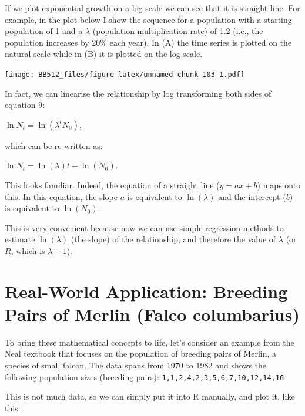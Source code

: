 \documentclass[
  a4paper]{book}
\newenvironment{Shaded}{\begin{snugshade}}{\end{snugshade}}
\newcommand{\AttributeTok}[1]{\textcolor[rgb]{0.13,0.29,0.53}{#1}}
\newcommand{\DecValTok}[1]{\textcolor[rgb]{0.00,0.00,0.81}{#1}}
\newcommand{\FunctionTok}[1]{\textcolor[rgb]{0.13,0.29,0.53}{\textbf{#1}}}
\newcommand{\NormalTok}[1]{#1}
\newcommand{\OtherTok}[1]{\textcolor[rgb]{0.56,0.35,0.01}{#1}}
\newcommand{\SpecialCharTok}[1]{\textcolor[rgb]{0.81,0.36,0.00}{\textbf{#1}}}
\newcommand{\StringTok}[1]{\textcolor[rgb]{0.31,0.60,0.02}{#1}}
\begin{document}
If we plot exponential growth on a log scale we can see that it is straight line. For example, in the plot below I show the sequence for a population with a starting population of 1 and a \(\lambda\) (population multiplication rate) of 1.2 (i.e., the population increases by 20\% each year). In (A) the time series is plotted on the natural scale while in (B) it is plotted on the log scale.

\texttt{[image: BB512\_files/figure-latex/unnamed-chunk-103-1.pdf]}

In fact, we can linearise the relationship by log transforming both sides of equation 9:

\(\ln{N_t} = \ln(\lambda ^tN_0)\),

which can be re-written as:

\(\ln{N_t} = \ln(\lambda )t + \ln(N_0)\).

This looks familiar. Indeed, the equation of a straight line (\(y = ax + b\)) maps onto this. In this equation, the slope \(a\) is equivalent to \(\ln(\lambda )\) and the intercept (\(b\)) is equivalent to \(\ln(N_0)\).

This is very convenient because now we can use simple regression methods to estimate \(\ln(\lambda)\) (the slope) of the relationship, and therefore the value of \(\lambda\) (or \(R\), which is \(\lambda -1\)).

\hypertarget{real-world-application-breeding-pairs-of-merlin-falco-columbarius}{%
\section{Real-World Application: Breeding Pairs of Merlin (Falco columbarius)}\label{real-world-application-breeding-pairs-of-merlin-falco-columbarius}}

To bring these mathematical concepts to life, let's consider an example from the Neal textbook that focuses on the population of breeding pairs of Merlin, a species of small falcon. The data spans from 1970 to 1982 and shows the following population sizes (breeding pairs): \texttt{1,1,2,4,2,3,5,6,7,10,12,14,16}

This is not much data, so we can simply put it into R manually, and plot it, like this:

\begin{Shaded}
\end{Shaded}
\end{document}
